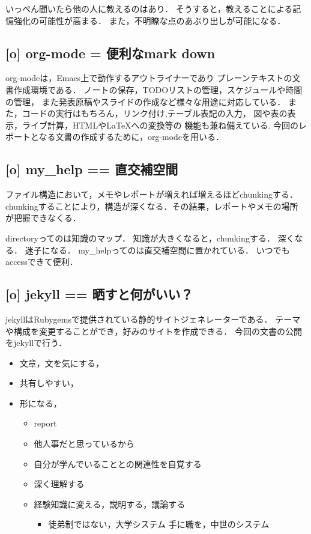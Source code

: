\documentclass{jsarticle}
\begin{document}
いっぺん聞いたら他の人に教えるのはあり．
そうすると，教えることによる記憶強化の可能性が高まる．
また，不明瞭な点のあぶり出しが可能になる．

\subsection{[o] org-mode = 便利なmark down}
\label{sec:orgdb0f71f}
org-modeは，Emacs上で動作するアウトライナーであり
プレーンテキストの文書作成環境である．
ノートの保存，TODOリストの管理，スケジュールや時間の管理，
また発表原稿やスライドの作成など様々な用途に対応している．
また，コードの実行はもちろん，リンク付け,テーブル表記の入力，
図や表の表示，ライブ計算，HTMLや\LaTeX{}への変換等の
機能も兼ね備えている.
今回のレポートとなる文書の作成するために，org-modeを用いる．

\subsection{[o] my\_help == 直交補空間}
\label{sec:org9a2f38a}
ファイル構造において，メモやレポートが増えれば増えるほどchunkingする．
chunkingすることにより，構造が深くなる．その結果，レポートやメモの場所
が把握できなくる．

directoryってのは知識のマップ．
知識が大きくなると，chunkingする．
深くなる．
迷子になる．
my\_helpってのは直交補空間に置かれている．
いつでもaccessできて便利．

\subsection{[o] jekyll == 晒すと何がいい？}
\label{sec:orgac6c24a}
jekyllはRubygemsで提供されている静的サイトジェネレーターである．
テーマや構成を変更することができ，好みのサイトを作成できる．
今回の文書の公開をjekyllで行う．
\begin{itemize}
\item 文章，文を気にする，
\item 共有しやすい，
\item 形になる，
\begin{itemize}
\item report
\item 他人事だと思っているから
\item 自分が学んでいることとの関連性を自覚する
\item 深く理解する
\item 経験知識に変える，説明する，議論する
\begin{itemize}
\item 徒弟制ではない，大学システム
手に職を，中世のシステム
\end{itemize}
\end{itemize}
\end{itemize}
\end{document}
